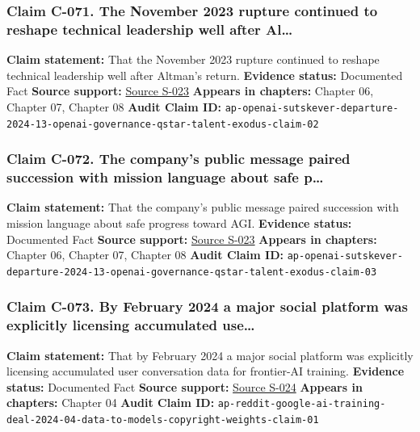 \documentclass[
  american,
  11pt,
  letterpaper,
]{article}
\begin{document}
\subsubsection{Claim C-071. The November 2023 rupture continued to
reshape technical leadership well after
Al\ldots{}}\label{claim-c-071-the-november-2023-rupture-continued-to-reshape-technical-leadership-well-after-al}

\textbf{Claim statement:} That the November 2023 rupture continued to
reshape technical leadership well after Altman's return.
\textbf{Evidence status:} Documented Fact \textbf{Source support:}
\hyperref[source-s-023-openai-co-founder-ilya-sutskever-announces-departure-from-chatgpt-maker]{Source
S-023} \textbf{Appears in chapters:} Chapter 06, Chapter 07, Chapter 08
\textbf{Audit Claim ID:}
\texttt{ap-openai-sutskever-departure-2024-13-openai-governance-qstar-talent-exodus-claim-02}

\subsubsection{Claim C-072. The company's public message paired
succession with mission language about safe
p\ldots{}}\label{claim-c-072-the-company-s-public-message-paired-succession-with-mission-language-about-safe-p}

\textbf{Claim statement:} That the company's public message paired
succession with mission language about safe progress toward AGI.
\textbf{Evidence status:} Documented Fact \textbf{Source support:}
\hyperref[source-s-023-openai-co-founder-ilya-sutskever-announces-departure-from-chatgpt-maker]{Source
S-023} \textbf{Appears in chapters:} Chapter 06, Chapter 07, Chapter 08
\textbf{Audit Claim ID:}
\texttt{ap-openai-sutskever-departure-2024-13-openai-governance-qstar-talent-exodus-claim-03}

\subsubsection{Claim C-073. By February 2024 a major social platform was
explicitly licensing accumulated
use\ldots{}}\label{claim-c-073-by-february-2024-a-major-social-platform-was-explicitly-licensing-accumulated-use}

\textbf{Claim statement:} That by February 2024 a major social platform
was explicitly licensing accumulated user conversation data for
frontier-AI training. \textbf{Evidence status:} Documented Fact
\textbf{Source support:}
\hyperref[source-s-024-reddit-strikes-60m-deal-allowing-google-to-train-ai-models-on-its-posts-unveils-ipo-plans]{Source
S-024} \textbf{Appears in chapters:} Chapter 04 \textbf{Audit Claim ID:}
\texttt{ap-reddit-google-ai-training-deal-2024-04-data-to-models-copyright-weights-claim-01}
\end{document}
